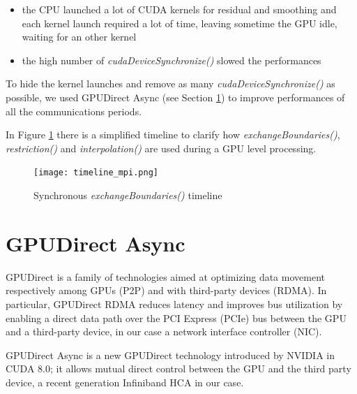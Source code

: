 \documentclass[conference]{IEEEtran}
\begin{document}
\begin{itemize}
\item the CPU launched a lot of CUDA kernels for residual and smoothing and each kernel launch required a lot of time, leaving sometime the GPU idle, waiting for an other kernel
\item the high number of \textit{cudaDeviceSynchronize()} slowed the performances 
\end{itemize}

To hide the kernel launches and remove as many   \textit{cudaDeviceSynchronize()} as possible, we used GPUDirect Async (see Section \ref{sec:gpudirect_async}) to improve performances of all the communications periods.

In Figure \ref{fig:timeline_mpi} there is a simplified timeline to clarify how \textit{exchangeBoundaries()}, \textit{restriction()} and \textit{interpolation()} are used during a GPU level processing.

\begin{figure}[h]
\centering
\texttt{[image: timeline\_mpi.png]}
\caption{Synchronous \textit{exchangeBoundaries()} timeline}
\label{fig:timeline_mpi}
\end{figure}

\section{GPUDirect Async}\label{sec:gpudirect_async}

GPUDirect \cite{GPUDirect} is a family of technologies aimed at optimizing data movement respectively among GPUs (P2P) and with third-party devices (RDMA). In particular, GPUDirect RDMA reduces latency and improves bus utilization by enabling a direct data path over the PCI Express (PCIe) bus between the GPU and a third-party device, in our case a network interface controller (NIC).

GPUDirect Async is a new GPUDirect technology introduced by NVIDIA in CUDA 8.0; it allows mutual direct control between the GPU and the third party device, a recent generation Infiniband HCA in our case.
\end{document}
